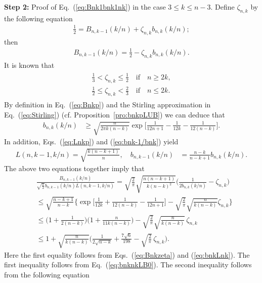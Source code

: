 \documentclass[aop]{imsart}
\theoremstyle{plain}
\theoremstyle{remark}
\newcommand{\1}{\operatorname{\uppercase\expandafter{\romannumeral1}}}
\newcommand{\2}{\operatorname{\uppercase\expandafter{\romannumeral2}}}
\newcommand{\3}{\operatorname{\uppercase\expandafter{\romannumeral3}}}
\newcommand{\4}{\operatorname{\uppercase\expandafter{\romannumeral4}}}
\newcommand{\5}{\operatorname{\uppercase\expandafter{\romannumeral5}}}
\newcommand{\6}{\operatorname{\uppercase\expandafter{\romannumeral6}}}
\newcommand{\7}{\operatorname{\uppercase\expandafter{\romannumeral7}}}
\newcommand{\8}{\operatorname{\uppercase\expandafter{\romannumeral8}}}
\newcommand{\9}{\operatorname{\uppercase\expandafter{\romannumeral9}}}
\newcommand{\eref}[1]{Eq.~\textup{(\ref{#1})}}
\newcommand{\eqsref}[2]{Eqs.~(\ref{#1}) and (\ref{#2})}
\newcommand{\pref}[1]{Proposition~\ref{#1}}
\begin{document}
\begin{appendix}
	
\textbf{Step 2:} Proof of \eref{eq:Bnk1bnk1nk} in the case $3 \le k \le n-3$. Define $\zeta_{n,k}$ by the following equation
	\begin{align}\label{eq:zetank}
	\frac{1}{2}=B_{n,k-1}(k/n)+\zeta_{n,k} b_{n,k}(k/n);
	\end{align}
	then 
	\begin{align}
	B_{n,k-1}(k/n)=\frac{1}{2}-\zeta_{n,k} b_{n,k}(k/n). \label{eq:Bnkzeta}
	\end{align}
	It is known that \cite{JogdS68}
	\begin{align}\label{eq:zetaLBUB}
	\begin{aligned}
	\frac{1}{3}<\zeta_{n,k}\leq \frac{1}{2} \quad \mbox{if}\quad  n\geq 2k, \\
	\frac{1}{2}\leq \zeta_{n,k}< \frac{2}{3} \quad \mbox{if}\quad  n\leq 2k.
	\end{aligned}
	\end{align}
By definition in \eref{eq:Bnkp} and the Stirling approximation in 
	\eref{eq:Stirling} (cf. \pref{pro:bnkpLUB}) we can deduce that
	\begin{align}
	b_{n,k}(k/n)&
	\geq \sqrt{\frac{n}{2\pi k(n-k)}}\exp\biggl[\frac{1}{12n+1}-\frac{1}{12 k}-\frac{1}{12(n-k)}\biggr]. \label{eq:bnknkLB0}
	\end{align}	
In addition, \eqsref{eq:Lnkp}{eq:bnk-1/bnk} yield 
\begin{align}
L(n,k-1,k/n)=\sqrt{\frac{k(n-k+1)}{n}}, \quad 	b_{n,k-1}(k/n)&=\frac{n-k}{n-k+1}b_{n,k}(k/n).\label{eq:bnkLnk}
	\end{align}
	The above two equations together imply that 
	\begin{align}\label{eq:BbLratioProof}
	&\frac{B_{n,k-1}(k/n)}{\sqrt{\frac{\pi}{2}} b_{n,k-1}(k/n) L(n,k-1,k/n)}=\sqrt{\frac{2}{\pi}}\sqrt{\frac{n(n-k+1)}{k(n-k)^2}}\biggl(\frac{1}{2b_{n,k}(k/n)}-\zeta_{n,k}\biggr)
	\\
	&\leq \sqrt{\frac{n-k+1}{n-k}}\biggl\{\exp\biggl[\frac{1}{12 k}+\frac{1}{12(n-k)}-\frac{1}{12n+1}\biggr]-\sqrt{\frac{2}{\pi}}
	\sqrt{\frac{n}{k(n-k)}}
	\zeta_{n,k}\biggr\}\nonumber \\
	&\leq  \biggl(1+\frac{1}{2(n-k)}\biggr)\biggl(1+\frac{n}{11k(n-k)}\biggr) -\sqrt{\frac{2}{\pi}} \sqrt{\frac{n}{k(n-k)}}\,
	\zeta_{n,k} \nonumber \\
&	\leq  1+\sqrt{\frac{n}{k(n-k)}}\biggl(\frac{1}{2\sqrt{n-k}}+
	\frac{7\sqrt{6}}{198}-\sqrt{\frac{2}{\pi}}\,
	\zeta_{n,k}
	\biggr).\nonumber
	\end{align}
Here the first equality follows from \eqsref{eq:Bnkzeta}{eq:bnkLnk}. The first inequality follows from \eref{eq:bnknkLB0}. The second inequality  follows from the following equation

\end{appendix}
\end{document}

